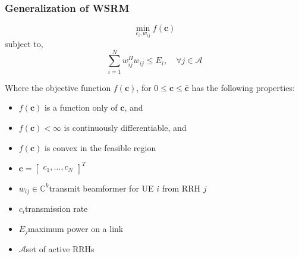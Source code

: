\documentclass[usenames,dvipsnames]{beamer}
\begin{document}
\begin{frame}
  \frametitle{Generalization of WSRM}
  \vspace*{-.5\baselineskip}
  \begin{exampleblock}{}
    \[
      \min_{c_{i},w_{ij}} f(\mathbf{c})
    \]
    subject to,
    \[
      \sum_{i=1}^{N}w_{ij}^{H}w_{ij}\leq E_{i},\quad \forall j\in \mathcal{A}
    \]
  \end{exampleblock}
  Where the objective function $f(\mathbf{c})$, for $0\leq\mathbf{c}\leq\bar{\mathbf{c}}$ has the following properties:
  \begin{itemize}
    \item $f(\mathbf{c})$ is a function only of $\mathbf{c}$, and
    \item $f(\mathbf{c})<\infty$ is continuously differentiable, and
    \item $f(\mathbf{c})$ is convex in the feasible region
    \item $\mathbf{c} = \begin{bmatrix}c_{1},\dots,c_{N}\end{bmatrix}^T$
    \item $w_{ij}\in\mathbb{C}^{k}$\quad transmit beamformer for UE $i$ from RRH $j$
    \item $c_{i}$\qquad transmission rate
    \item $E_{j}$\qquad maximum power on a link
    \item $\mathcal{A}$\qquad set of active RRHs
  \end{itemize}
\end{frame}
\end{document}
